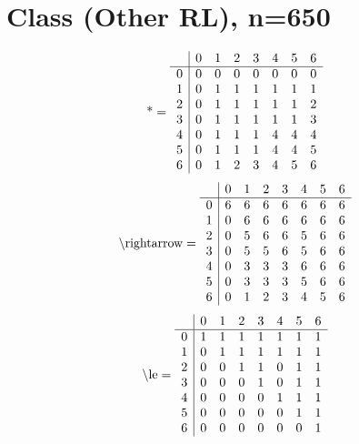 \documentclass[11pt]{article}
\begin{document}
\section{Class (Other RL), n=650}
\[\text{*} = 
\begin{array}{r | r r r r r r r}
 & 0 & 1 & 2 & 3 & 4 & 5 & 6 \\ \hline
0 & 0 & 0 & 0 & 0 & 0 & 0 & 0 \\
1 & 0 & 1 & 1 & 1 & 1 & 1 & 1 \\
2 & 0 & 1 & 1 & 1 & 1 & 1 & 2 \\
3 & 0 & 1 & 1 & 1 & 1 & 1 & 3 \\
4 & 0 & 1 & 1 & 1 & 4 & 4 & 4 \\
5 & 0 & 1 & 1 & 1 & 4 & 4 & 5 \\
6 & 0 & 1 & 2 & 3 & 4 & 5 & 6 \\
\end{array}
\]
\[\text{\textbackslash rightarrow} = 
\begin{array}{r | r r r r r r r}
 & 0 & 1 & 2 & 3 & 4 & 5 & 6 \\ \hline
0 & 6 & 6 & 6 & 6 & 6 & 6 & 6 \\
1 & 0 & 6 & 6 & 6 & 6 & 6 & 6 \\
2 & 0 & 5 & 6 & 6 & 5 & 6 & 6 \\
3 & 0 & 5 & 5 & 6 & 5 & 6 & 6 \\
4 & 0 & 3 & 3 & 3 & 6 & 6 & 6 \\
5 & 0 & 3 & 3 & 3 & 5 & 6 & 6 \\
6 & 0 & 1 & 2 & 3 & 4 & 5 & 6 \\
\end{array}
\]
\[\text{\textbackslash le} = 
\begin{array}{r | r r r r r r r}
 & 0 & 1 & 2 & 3 & 4 & 5 & 6 \\ \hline
0 & 1 & 1 & 1 & 1 & 1 & 1 & 1 \\
1 & 0 & 1 & 1 & 1 & 1 & 1 & 1 \\
2 & 0 & 0 & 1 & 1 & 0 & 1 & 1 \\
3 & 0 & 0 & 0 & 1 & 0 & 1 & 1 \\
4 & 0 & 0 & 0 & 0 & 1 & 1 & 1 \\
5 & 0 & 0 & 0 & 0 & 0 & 1 & 1 \\
6 & 0 & 0 & 0 & 0 & 0 & 0 & 1 \\
\end{array}
\]
\end{document}
